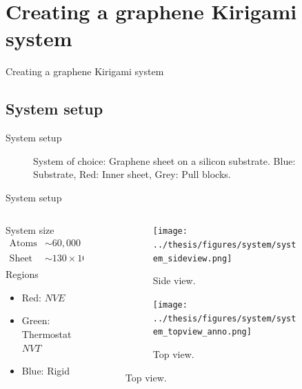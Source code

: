 \documentclass[
	10pt, %
]{beamer}
\begin{document}
\section{Creating a graphene Kirigami system} %
\begin{frame}{Creating a graphene Kirigami system}
    \tableofcontents[currentsection]
\end{frame}


\subsection{System setup}
\begin{frame}{System setup}
	\begin{figure}
		\centering    
		\caption{System of choice: Graphene sheet on a silicon substrate. Blue: Substrate, Red: Inner sheet, Grey: Pull blocks. }
	\end{figure} 
\end{frame}
%
%
\begin{frame}{System setup}
	\begin{columns} 
		\hspace{5mm}
		\begin{column}{.4\textwidth}
			System size
			\begin{align*}
				\text{Atoms} &\sim 60,000 \\
				\text{Sheet} &\sim 130 \times \SI{165}{\text{Å}} \\
			\end{align*}
			Regions
			\begin{itemize}
				\item Red: $NVE$
				\item Green: Thermostat $NVT$
				\item Blue: Rigid 
			\end{itemize}
		\end{column}
		\begin{column}{.5\textwidth}
			\begin{figure}[H]
				\raggedright
				\begin{subfigure}[b]{0.9\textwidth}
					\centering
					\texttt{[image: ../thesis/figures/system/system\_sideview.png]}
					\caption{Side view.}
				\end{subfigure}
				\begin{subfigure}[b]{0.9\textwidth}
					\centering
					\texttt{[image: ../thesis/figures/system/system\_topview\_anno.png]}
					\caption{Top view.}
				\end{subfigure}
			\end{figure}
		\end{column}%
	\end{columns}


	
\end{frame}
%
%
\end{document}
